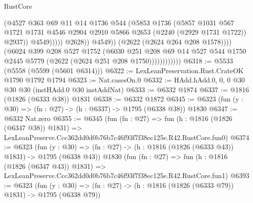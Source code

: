 \begin{lexlean}{RustCore}
\begin{coremodule}
                                        (@4527
                                          @363
                                          @69
                                          @11
                                          @14
                                          @1736
                                          @544
                                          (@5853
                                            @1736
                                            (@5857
                                              @1031
                                              @567
                                              @1721
                                              @1731
                                              @4546
                                              @2904
                                              @2910
                                              @5866
                                              @2653
                                              (@2240 (@2929 @1731 @1722))
                                              @2937))
                                          @4549)))))
                                @2628))
                            @4549))
                        (@2622 (@2624 @264 @208 @1578))))
                    (@6024
                      @399
                      @208
                      @527
                      @1752
                      (@6030
                        @251
                        @208
                        @69
                        @14
                        @527
                        @544
                        @1750
                        @2445
                        @5779
                        (@2622 (@2624 @251 @208 @1750))))))))))))
@6318 := @5533 (@5558 (@5599 (@5601 @6314)))
@6322 := LexLeanPreservation.Rust.CrateOK @1790 @1792 @1794
@6323 := Nat.casesOn.{0}
@6332 := HAdd.hAdd.{0, 0, 0} @30 @30 @30 (instHAdd.{0} @30 instAddNat)
@6333 := @6332 @1874
@6337 := @1816 (@1826 (@6333 @38)) @1831
@6338 := @6332 @1872
@6345 := @6323 (fun (y : @30) => (fn : @27) -> (h : @6337) -> @1795 (@6338 @38)) @1830
@6347 := @6332 Nat.zero
@6355 := @6345
    (fun (fn : @27) =>
    fun (h : @1816 (@1826 (@6347 @38)) @1831) =>
    LexLeanPreserve.Ccc362dd0d0b76b7c46f93f7f38ec125e.R42.RustCore.fun0)
@6374 := @6323
    (fun (y : @30) => (fn : @27) -> (h : @1816 (@1826 (@6333 @43)) @1831) -> @1795 (@6338 @43))
    @1830
    (fun (fn : @27) =>
    fun (h : @1816 (@1826 (@6347 @43)) @1831) =>
    LexLeanPreserve.Ccc362dd0d0b76b7c46f93f7f38ec125e.R42.RustCore.fun1)
@6393 := @6323
    (fun (y : @30) => (fn : @27) -> (h : @1816 (@1826 (@6333 @79)) @1831) -> @1795 (@6338 @79))

\end{coremodule}
\end{lexlean}
